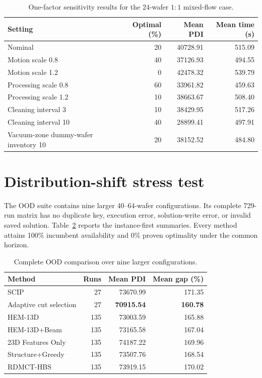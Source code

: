 \documentclass[11pt]{article}
\begin{document}
\begin{table}[htbp]
\centering
\caption{One-factor sensitivity results for the 24-wafer $1{:}1$ mixed-flow case.}
\label{tab:sensitivity}
\begin{tabular}{lrrr}
\toprule
Setting & Optimal (\%) & Mean PDI & Mean time (s) \\
\midrule
Nominal & 20 & 40728.91 & 515.09 \\
Motion scale 0.8 & 40 & 37126.93 & 494.55 \\
Motion scale 1.2 & 0 & 42478.32 & 539.79 \\
Processing scale 0.8 & 60 & 33961.82 & 459.63 \\
Processing scale 1.2 & 10 & 38663.67 & 508.40 \\
Cleaning interval 3 & 10 & 38429.95 & 517.26 \\
Cleaning interval 10 & 40 & 28899.41 & 497.91 \\
Vacuum-zone dummy-wafer inventory 10 & 20 & 38152.52 & 484.80 \\
\bottomrule
\end{tabular}
\end{table}

\section{Distribution-shift stress test}

The OOD suite contains nine larger 40--64-wafer configurations. Its complete
729-run matrix has no duplicate key, execution error, solution-write error, or
invalid saved solution. Table~\ref{tab:ood} reports the instance-first
summaries. Every method attains 100\% incumbent availability and 0\% proven
optimality under the common horizon.

\begin{table}[htbp]
\centering
\caption{Complete OOD comparison over nine larger configurations.}
\label{tab:ood}
\begin{tabular}{lrrr}
\toprule
Method & Runs & Mean PDI & Mean gap (\%) \\
\midrule
SCIP & 27 & 73670.99 & 171.35 \\
Adaptive cut selection & 27 & \textbf{70915.54} & \textbf{160.78} \\
HEM-13D & 135 & 73003.59 & 165.88 \\
HEM-13D+Beam & 135 & 73165.58 & 167.04 \\
23D Features Only & 135 & 74187.22 & 169.96 \\
Structure+Greedy & 135 & 73507.76 & 168.54 \\
RDMCT-HBS & 135 & 73919.15 & 170.02 \\
\bottomrule
\end{tabular}
\end{table}
\end{document}
